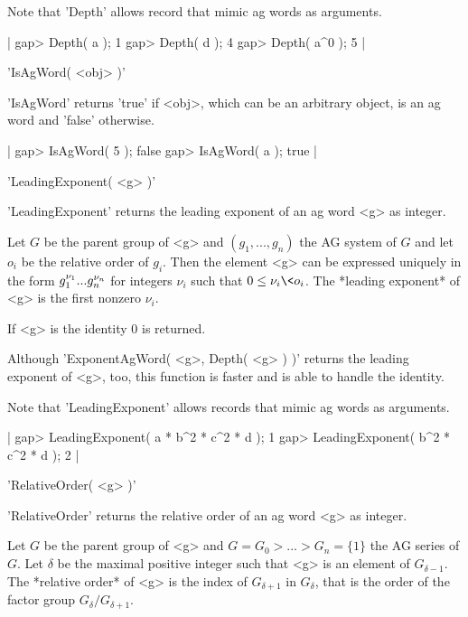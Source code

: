 Note that 'Depth' allows record that mimic  ag  words as arguments.

|    gap> Depth( a );
    1
    gap> Depth( d );
    4
    gap> Depth( a^0 );
    5 |


'IsAgWord( <obj> )'

'IsAgWord' returns 'true' if <obj>, which can be  an arbitrary object, is
an ag word and 'false' otherwise.

|    gap> IsAgWord( 5 );
    false
    gap> IsAgWord( a );
    true |


'LeadingExponent( <g> )'

'LeadingExponent'  returns  the leading  exponent  of  an ag word  <g> as
integer.

Let $G$ be the parent group of <g> and $(g_1, ..., g_n)$ the AG system of
$G$ and let $o_i$ be the relative order  of $g_i$.  Then the  element <g>
can be  expressed uniquely in the form $g_1^{\nu_1}\*  ...\* g_n^{\nu_n}$
for  integers $\nu_i$ such  that $0  \leq \nu_i  \<  o_i$.   The *leading
exponent* of <g> is the first nonzero $\nu_i$.

If <g> is the identity 0 is returned.

Although  'ExponentAgWord(   <g>, Depth( <g>   ) )'  returns  the leading
exponent of <g>, too, this function is faster and is able  to  handle the
identity.

Note  that  'LeadingExponent' allows  records   that  mimic ag   words as
arguments.

|    gap> LeadingExponent( a * b^2 * c^2 * d );
    1
    gap> LeadingExponent( b^2 * c^2 * d );
    2 |


'RelativeOrder( <g> )'

'RelativeOrder' returns the relative order of an ag word <g> as integer.

Let $G$ be  the parent group of <g>  and $G=G_0  > ... >   G_n=\{1\}$ the
AG series of $G$.  Let $\delta$ be the maximal positive integer such that
<g> is an element of $G_{\delta-1}$.  The *relative  order* of <g> is the
index of  $G_{\delta+1}$ in  $G_\delta$,   that   is  the  order  of  the
factor group $G_\delta/G_{\delta+1}$.

